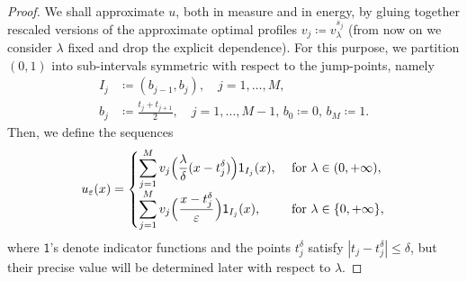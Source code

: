 \documentclass[10pt,a4paper]{amsart}
\newcommand{\del}{\delta}
\newcommand{\e}{\varepsilon}
\begin{document}
\begin{proof}
   We shall approximate $u$, both in measure and in energy, by gluing together rescaled versions of the approximate optimal profiles $v_j\coloneqq v^{s_j}_\lambda$ (from now on we consider $\lambda$ fixed and drop the explicit dependence).  For this purpose, we partition $(0,1)$ into sub-intervals symmetric with respect to the jump-points, namely
    \begin{align*}
        I_j &\coloneqq  (b_{j-1}, b_j), \quad j=1,\ldots, M, \\
        b_j &\coloneqq \frac{t_j+t_{j+1}}{2}, \quad j=1,\ldots, M-1, \,b_0\coloneqq 0, \,
        b_{M}\coloneqq 1.
    \end{align*}
     Then, we define the sequences
    \begin{equation}
        \label{eq:recovery_sequence}
        u_\e(x) = \begin{cases}
            \displaystyle\sum_{j=1}^M v_{j}\Big( \frac{\lambda}{ \del}(x-t_j^\delta) \Big)\mathsf{1}_{I_j}(x), &\text{ for }\lambda\in (0,+\infty),\\
            \displaystyle\sum_{j=1}^M v_{j}\Big(\mkern1mu\frac{x-t_j^\delta}{ \e} \mkern1mu\Big)\mathsf{1}_{I_j}(x), &\text{ for }\lambda\in \{0,+\infty\},\\
        \end{cases}
    \end{equation}
    where $\mathsf{1}$'s denote indicator functions and the points $t^\delta_j$ satisfy $|t_j-t_j^\delta|\le\del$, but their precise value will be determined later with respect to $\lambda$.
    

\end{proof}
\end{document}
